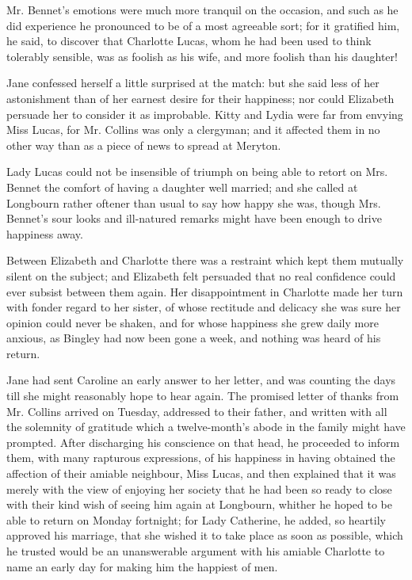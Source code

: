 \documentclass[10pt]{book}
\begin{document}
   Mr. Bennet’s emotions were much more tranquil on the occasion, and such
as he did experience he pronounced to be of a most agreeable sort; for
it gratified him, he said, to discover that Charlotte Lucas, whom he had
been used to think tolerably sensible, was as foolish as his wife, and
more foolish than his daughter!
  

   Jane confessed herself a little surprised at the match: but she said
less of her astonishment than of her earnest desire for their happiness;
nor could Elizabeth persuade her to consider it as improbable. Kitty and
Lydia were far from envying Miss Lucas, for Mr. Collins was only a
clergyman; and it affected them in no other way than as a piece of news
to spread at Meryton.
  

   Lady Lucas could not be insensible of triumph on being able to retort on
Mrs. Bennet the comfort of having a daughter well married; and she
called at Longbourn rather oftener than usual to say how happy she was,
though Mrs. Bennet’s sour looks and ill-natured remarks might have been
enough to drive happiness away.
  

   Between Elizabeth and Charlotte there was a restraint which kept them
mutually silent on the subject; and Elizabeth felt persuaded that no
real confidence could
   ever subsist between them again. Her
disappointment in Charlotte made her turn with fonder regard to her
sister, of whose rectitude and delicacy she was sure her opinion could
never be shaken, and for whose happiness she grew daily more anxious, as
Bingley had now been gone a week, and nothing was heard of his return.
  

   Jane had sent Caroline an early answer to her letter, and was counting
the days till she might reasonably hope to hear again. The promised
letter of thanks from Mr. Collins arrived on Tuesday, addressed to their
father, and written with all the solemnity of gratitude which a
twelve-month’s abode in the family might have prompted. After
discharging his conscience on that head, he proceeded to inform them,
with many rapturous expressions, of his happiness in having obtained the
affection of their amiable neighbour, Miss Lucas, and then explained
that it was merely with the view of enjoying her society that he had
been so ready to close with their kind wish of seeing him again at
Longbourn, whither he hoped to be able to return on Monday fortnight;
for Lady Catherine, he added, so heartily approved his marriage, that
she wished it to take place as soon as possible, which he trusted would
be an unanswerable argument with his amiable Charlotte to name an early
day for making him the happiest of men.
  
\end{document}
